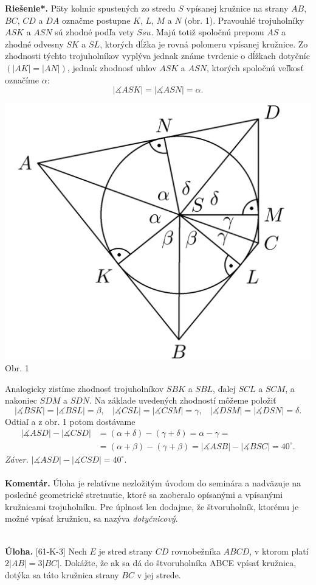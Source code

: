 \documentclass[11pt,a4paper,oneside,final]{book}
\newcommand{\kom}{\textbf{Komentár.} }
\newcommand{\ul}{\textbf{Úloha.} }
\newcommand{\rieh}{\textbf{Riešenie*.} }
\newcommand{\ma}{\measuredangle}
\begin{document}
\rieh Päty kolmíc spustených zo stredu $S$ vpísanej kružnice na strany $AB$, $BC$, $CD$ a $DA$ označme postupne $K$, $L$, $M$ a $N$ (obr. 1). Pravouhlé trojuholníky $ASK$ a $ASN$ sú zhodné podľa vety $Ssu$. Majú totiž spoločnú preponu $AS$ a zhodné odvesny $SK$ a $SL$, ktorých dĺžka je rovná polomeru vpísanej kružnice. Zo zhodnosti týchto trojuholníkov vyplýva jednak známe tvrdenie o dĺžkach dotyčníc $(|AK| = |AN|)$, jednak zhodnosť uhlov $ASK$ a $ASN$, ktorých spoločnú veľkosť označíme $\alpha$:$$|\ma ASK| = |\ma ASN| = \alpha.$$
\begin{center}
\includegraphics{57D2}\\

Obr. 1
\end{center}
Analogicky zistíme zhodnosť trojuholníkov $SBK$ a $SBL$, ďalej $SCL$ a $SCM$, a nakoniec $SDM$ a $SDN$. Na základe uvedených zhodností môžeme položiť
$$|\ma BSK| = |\ma BSL| = \beta, \ \ \ \  |\ma CSL| = |\ma CSM| = \gamma, \ \ \ \  |\ma DSM| = |\ma DSN| = \delta.$$
Odtiaľ a z obr. 1 potom dostávame
\begin{align*}
|\ma ASD| - |\ma CSD| &= (\alpha + \delta)- (\gamma + \delta) = \alpha - \gamma =\\
&= (\alpha + \beta) - (\gamma + \beta) = |\ma ASB| - |\ma BSC| = 40^\circ.
\end{align*}
\textit{Záver.} $|\ma ASD|  -|\ma CSD| = 40^\circ$.\\
\\
\kom Úloha je relatívne nezložitým úvodom do seminára a nadväzuje na posledné geometrické stretnutie, ktoré sa zaoberalo opísanými a vpísanými kružnicami trojuholníku. Pre úplnosť len dodajme, že štvoruholník, ktorému je možné vpísať kružnicu, sa nazýva \textit{dotyčnicový}.\\
\\
\begin{tcolorbox}[breakable,notitle,boxrule=0pt,colback=light-gray,colframe=light-gray]\ul [61-K-3] Nech $E$ je stred strany $CD$ rovnobežníka $ABCD$, v ktorom platí $2|AB| = 3|BC|$. Dokážte, že ak sa dá do štvoruholníka ABCE vpísať kružnica, dotýka sa táto kružnica strany $BC$ v jej strede.

\end{tcolorbox}
\end{document}

